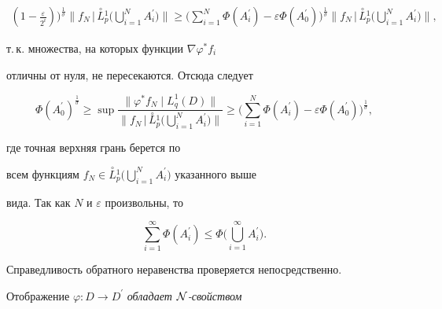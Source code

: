 \begin{pf}
\begin{multline*}
\left(1-\frac{\varepsilon}{2^i}\right)\bigg)^{\frac{1}{\sigma}}


\bigg\|f_N\,\Big|\, \overset{\circ}{L}{}_{p}^{1}


\Big(\bigcup_{i=1}^{N}A_i^{\prime}\Big)\bigg\|


\geq \bigg(\sum_{i=1}^{N}\Phi(A_i^{\prime})


-\varepsilon\Phi(A_0^{\prime}) \bigg)^{\frac{1}{\sigma}}


\bigg\|f_N\,\Big|\, \overset{\circ}{L}{}_{p}^{1}


\Big(\bigcup_{i=1}^{N}A_i^{\prime}\Big)\bigg\|,


\end{multline*}


т.\,к. множества, на которых функции $\nabla \varphi^{\ast} f_i$


отличны от нуля, не пересекаются. Отсюда следует


$$


\Phi(A_0^{\prime})^{\frac{1}{\sigma}}\geq\sup\frac


{\|\varphi^{\ast} f_N\mid{L}_{q}^{1} (D)\|}


{\bigg\|f_N\,\Big|\, \overset{\circ}{L}{}_{p}^{1}


\Big(\bigcup\limits_{i=1}^{N}A_i^{\prime}\Big)\bigg\|}\geq


\bigg(\sum_{i=1}^{N}\Phi(A_i^{\prime})-\varepsilon\Phi(A_0^{\prime})


\bigg)^{\frac{1}{\sigma}},


$$


где точная верхняя грань берется по


всем функциям $f_N\in\overset{\circ}{L}{}_{p}^{1}


\Big(\bigcup\limits_{i=1}^{N}A_i^{\prime}\Big)$ указанного выше


вида. Так как $N$ и $\varepsilon$ произвольны, то


$$


\sum_{i=1}^{\infty}\Phi(A^{\prime}_i) \leq


\Phi\Big(\bigcup_{i=1}^{\infty}A^{\prime}_i\Big).


$$


Справедливость обратного неравенства проверяется непосредственно.


\end{pf}





Отображение $\varphi : D\to D^{\prime}$ {\it обладает $\cal N$-свойством}


